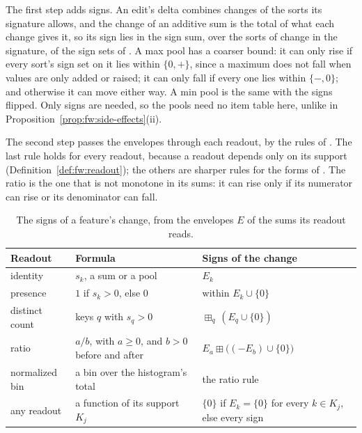 The first step adds signs. An edit's delta combines changes of the sorts its signature allows, and the change of an
additive sum is the total of what each change gives it, so its sign lies in the sign sum, over the sorts of change in
the signature, of the sign sets of . A max pool has a coarser bound: it can only rise if every
sort's sign set on it lies within $\{0, +\}$, since a maximum does not fall when values are only added or raised; it
can only fall if every one lies within $\{-, 0\}$; and otherwise it can move either way. A min pool is the same with
the signs flipped. Only signs are needed, so the pools need no item table here, unlike in
Proposition~\ref{prop:fw:side-effects}(ii).

The second step passes the envelopes through each readout, by the rules of . The last rule
holds for every readout, because a readout depends only on its support (Definition~\ref{def:fw:readout}); the others
are sharper rules for the forms of . The ratio is the one that is not monotone in its sums: it can
rise only if its numerator can rise or its denominator can fall.

\begin{table}[t]
  \caption{The signs of a feature's change, from the envelopes $E$ of the sums its readout reads.}
  \label{tab:fw:readouts}
  \small
  \begin{tabular}{@{}p{}p{}p{}@{}}
    \toprule
    Readout & Formula & Signs of the change \\
    \midrule
    identity & $s_k$, a sum or a pool & $E_k$ \\
    presence & $1$ if $s_k > 0$, else $0$ & within $E_k \cup \{0\}$ \\
    distinct count & keys $q$ with $s_q > 0$ & $\boxplus_q \, (E_q \cup \{0\})$ \\
    ratio & $a / b$, with $a \ge 0$, and $b > 0$ before and after & $E_a \boxplus \big((-E_b) \cup \{0\}\big)$ \\
    normalized bin & a bin over the histogram's total & the ratio rule \\
    any readout & a function of its support $K_j$ & $\{0\}$ if $E_k = \{0\}$ for every $k \in K_j$, else every
      sign \\
    \bottomrule
  \end{tabular}
\end{table}

